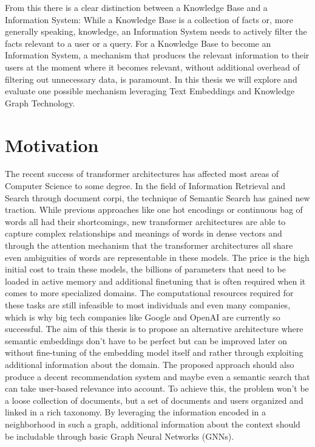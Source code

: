\documentclass[draft,final]{vutinfth} %
\begin{document}
From this there is a clear distinction between a Knowledge Base and a Information System: While a Knowledge Base is a collection of facts or, more generally speaking, knowledge, an Information System needs to actively filter the facts relevant to a user or a query. 
For a Knowledge Base to become an Information System, a mechanism that produces the relevant information to their users at the moment where it becomes relevant, without additional overhead of filtering out unnecessary data, is paramount. In this thesis we will explore and evaluate one possible mechanism leveraging Text Embeddings and Knowledge Graph Technology.

\section{Motivation}
The recent success of transformer architectures has affected most areas of Computer Science to some degree. In the field of Information Retrieval and Search through document corpi, the technique of Semantic Search has gained new traction. While previous approaches like one hot encodings or continuous bag of words all had their shortcomings, new transformer architectures are able to capture complex relationships and meanings of words in dense vectors and through the attention mechanism that the transformer architectures all share even ambiguities of words are representable in these models.
The price is the high initial cost to train these models, the billions of parameters that need to be loaded in active memory and additional finetuning that is often required when it comes to more specialized domains.
The computational resources required for these tasks are still infeasible to most individuals and even many companies, which is why big tech companies like Google and OpenAI are currently so successful. The aim of this thesis is to propose an alternative architecture where semantic embeddings don't have to be perfect but can be improved later on without fine-tuning of the embedding model itself and rather through exploiting additional information about the domain. The proposed approach should also produce a decent recommendation system and maybe even a semantic search that can take user-based relevance into account. To achieve this, the problem won't be a loose collection of documents, but a set of documents and users organized and linked in a rich taxonomy. By leveraging the information encoded in a neighborhood in such a graph, additional information about the context should be includable through basic Graph Neural Networks (GNNs).
\end{document}
